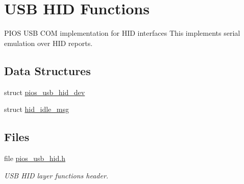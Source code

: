 \hypertarget{group___p_i_o_s___u_s_b___h_i_d}{\section{\-U\-S\-B \-H\-I\-D \-Functions}
\label{group___p_i_o_s___u_s_b___h_i_d}
}


\-P\-I\-O\-S \-U\-S\-B \-C\-O\-M implementation for \-H\-I\-D interfaces  \-This implements serial emulation over \-H\-I\-D reports.  


\subsection*{\-Data \-Structures}
\begin{DoxyCompactItemize}
\item 
struct \hyperlink{structpios__usb__hid__dev}{pios\-\_\-usb\-\_\-hid\-\_\-dev}
\item 
struct \hyperlink{structhid__idle__msg}{hid\-\_\-idle\-\_\-msg}
\end{DoxyCompactItemize}
\subsection*{\-Files}
\begin{DoxyCompactItemize}
\item 
file \hyperlink{pios__usb__hid_8h}{pios\-\_\-usb\-\_\-hid.\-h}
\begin{DoxyCompactList}\small\item\em \-U\-S\-B \-H\-I\-D layer functions header. \end{DoxyCompactList}\end{DoxyCompactItemize}
